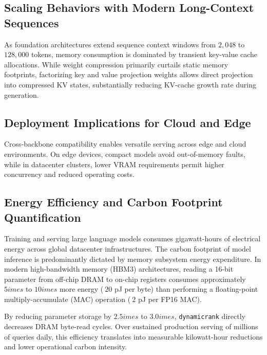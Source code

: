 \subsection{Scaling Behaviors with Modern Long-Context Sequences}
As foundation architectures extend sequence context windows from $2{,}048$ to $128{,}000$ tokens, memory consumption is dominated by transient key-value cache allocations. While weight compression primarily curtails static memory footprints, factorizing key and value projection weights allows direct projection into compressed KV states, substantially reducing KV-cache growth rate during generation.

\subsection{Deployment Implications for Cloud and Edge}
Cross-backbone compatibility enables versatile serving across edge and cloud environments. On edge devices, compact models avoid out-of-memory faults, while in datacenter clusters, lower VRAM requirements permit higher concurrency and reduced operating costs.

\subsection{Energy Efficiency and Carbon Footprint Quantification}
Training and serving large language models consumes gigawatt-hours of electrical energy across global datacenter infrastructures. The carbon footprint of model inference is predominantly dictated by memory subsystem energy expenditure. In modern high-bandwidth memory (HBM3) architectures, reading a 16-bit parameter from off-chip DRAM to on-chip registers consumes approximately $5	imes$ to $10	imes$ more energy ($~20$ pJ per byte) than performing a floating-point multiply-accumulate (MAC) operation ($~2$ pJ per FP16 MAC).

By reducing parameter storage by $2.5	imes$ to $3.0	imes$, \texttt{dynamicrank} directly decreases DRAM byte-read cycles. Over sustained production serving of millions of queries daily, this efficiency translates into measurable kilowatt-hour reductions and lower operational carbon intensity.
